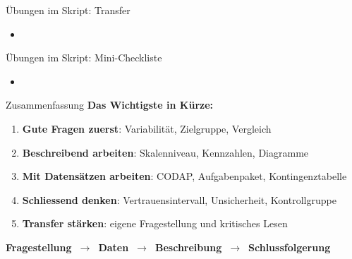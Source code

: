 \begin{frame}{Übungen im Skript: Transfer}
    \begin{itemize}
        \item {}
    \end{itemize}
\end{frame}

\begin{frame}{Übungen im Skript: Mini-Checkliste}
    \begin{itemize}
        \item {}
    \end{itemize}
\end{frame}

\begin{frame}{Zusammenfassung}
    \textbf{Das Wichtigste in Kürze:}
    \begin{enumerate}
        \item \textbf{Gute Fragen zuerst}: Variabilität, Zielgruppe, Vergleich
        \item \textbf{Beschreibend arbeiten}: Skalenniveau, Kennzahlen, Diagramme
        \item \textbf{Mit Datensätzen arbeiten}: CODAP, Aufgabenpaket, Kontingenztabelle
        \item \textbf{Schliessend denken}: Vertrauensintervall, Unsicherheit, Kontrollgruppe
        \item \textbf{Transfer stärken}: eigene Fragestellung und kritisches Lesen
    \end{enumerate}

    \vspace{1em}
    \begin{center}
        \Large
        \textbf{Fragestellung\ $\rightarrow$\ Daten\ $\rightarrow$\ Beschreibung\ $\rightarrow$\ Schlussfolgerung}
    \end{center}
\end{frame}
